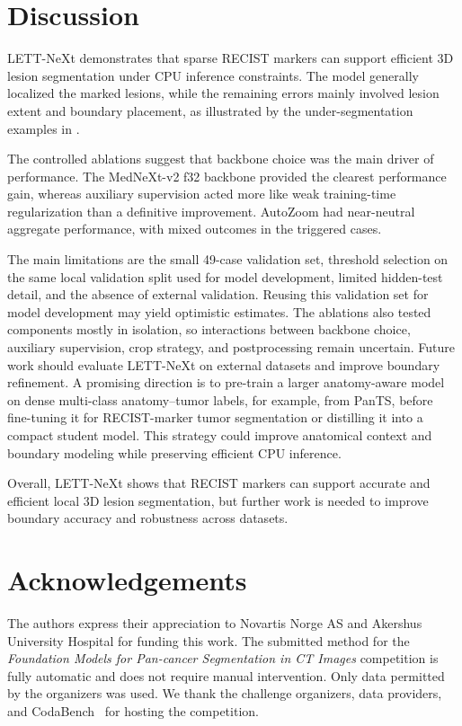 \section{Discussion}

LETT-NeXt demonstrates that sparse RECIST markers can support efficient 3D lesion segmentation under CPU inference constraints. 
The model generally localized the marked lesions, while the remaining errors mainly involved lesion extent and boundary placement, as illustrated by the under-segmentation examples in .

The controlled ablations suggest that backbone choice was the main driver of performance. 
The MedNeXt-v2 f32 backbone provided the clearest performance gain, whereas auxiliary supervision acted more like weak training-time regularization than a definitive improvement. 
AutoZoom had near-neutral aggregate performance, with mixed outcomes in the triggered cases.

The main limitations are the small 49-case validation set, threshold selection on the same local validation split used for model development, limited hidden-test detail, and the absence of external validation. 
Reusing this validation set for model development may yield optimistic estimates. The ablations also tested components mostly in isolation, so interactions between backbone choice, auxiliary supervision, crop strategy, and postprocessing remain uncertain.
Future work should evaluate LETT-NeXt on external datasets and improve boundary refinement. 
A promising direction is to pre-train a larger anatomy-aware model on dense multi-class anatomy--tumor labels, for example, from PanTS, before fine-tuning it for RECIST-marker tumor segmentation or distilling it into a compact student model. 
This strategy could improve anatomical context and boundary modeling while preserving efficient CPU inference.

Overall, LETT-NeXt shows that RECIST markers can support accurate and efficient local 3D lesion segmentation, but further work is needed to improve boundary accuracy and robustness across datasets.

\section*{Acknowledgements}
The authors express their appreciation to Novartis Norge AS and Akershus University Hospital for funding this work. The submitted method for the \emph{Foundation Models for Pan-cancer Segmentation in CT Images} competition is fully automatic and does not require manual intervention. Only data permitted by the organizers was used. We thank the challenge organizers, data providers, and CodaBench~\cite{xuCodabenchFlexibleEasytoUse2022} for hosting the competition.


